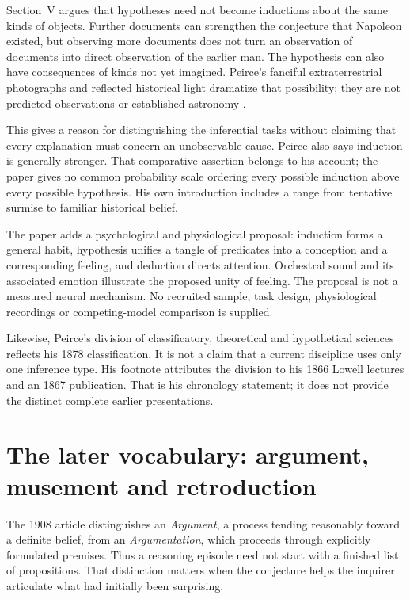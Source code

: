 Section~V argues that hypotheses need not become inductions about the
same kinds of objects. Further documents can strengthen the conjecture
that Napoleon existed, but observing more documents does not turn an
observation of documents into direct observation of the earlier man.
The hypothesis can also have consequences of kinds not yet imagined.
Peirce's fanciful extraterrestrial photographs and reflected historical
light dramatize that possibility; they are not predicted observations
or established astronomy \parencite[sec.~V]{Peirce1878DIHPrimary}.

This gives a reason for distinguishing the inferential tasks without
claiming that every explanation must concern an unobservable cause.
Peirce also says induction is generally stronger. That comparative
assertion belongs to his account; the paper gives no common probability
scale ordering every possible induction above every possible hypothesis.
His own introduction includes a range from tentative surmise to familiar
historical belief.

The paper adds a psychological and physiological proposal: induction
forms a general habit, hypothesis unifies a tangle of predicates into
a conception and a corresponding feeling, and deduction directs
attention. Orchestral sound and its associated emotion illustrate the
proposed unity of feeling. The proposal is not a measured neural
mechanism. No recruited sample, task design, physiological recordings
or competing-model comparison is supplied.

Likewise, Peirce's division of classificatory, theoretical and hypothetical
sciences reflects his 1878 classification. It is not a claim that a
current discipline uses only one inference type. His footnote attributes
the division to his 1866 Lowell lectures and an 1867 publication. That
is his chronology statement; it does not provide the distinct complete
earlier presentations.

\section{The later vocabulary: argument, musement and retroduction}
\label{sec:p16-peirce-1908-context}

The 1908 article distinguishes an \emph{Argument}, a process tending
reasonably toward a definite belief, from an \emph{Argumentation},
which proceeds through explicitly formulated premises. Thus a reasoning
episode need not start with a finished list of propositions. That
distinction matters when the conjecture helps the inquirer articulate
what had initially been surprising.

